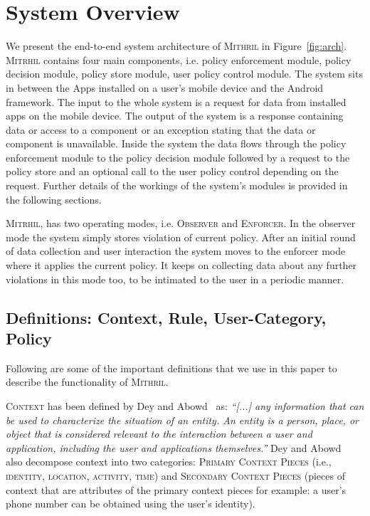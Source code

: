 \section{System Overview}
\label{overview}
We present the end-to-end system architecture of \textsc{Mithril} in Figure~\ref{fig:arch}. \textsc{Mitrhil} contains four main components, i.e. policy enforcement module, policy decision module, policy store module, user policy control module. The system sits in between the Apps installed on a user's mobile device and the Android framework. The input to the whole system is a request for data from installed apps on the mobile device. The output of the system is a response containing data or access to a component or an exception stating that the data or component is unavailable. Inside the system the data flows through the policy enforcement module to the policy decision module followed by a request to the policy store and an optional call to the user policy control depending on the request. Further details of the workings of the system's modules is provided in the following sections.

\textsc{Mitrhil}, has two operating modes, i.e. \textsc{Observer} and \textsc{Enforcer}. In the observer mode the system simply stores violation of current policy. After an initial round of data collection and user interaction the system moves to the enforcer mode where it applies the current policy. It keeps on collecting data about any further violations in this mode too, to be intimated to the user in a periodic manner.


\subsection{Definitions: Context, Rule, User-Category, Policy}
\label{defs}
Following are some of the important definitions that we use in this paper to describe the functionality of \textsc{Mithril}.

\begin{definition}
\textsc{Context} has been defined by Dey and Abowd~\cite{Dey99} as: {\em ``[...] any information that can be used to characterize the situation of an entity. An entity is a person, place, or object that is considered relevant to the interaction between a user and application, including the user and applications themselves.''} Dey and Abowd~\cite{Dey99} also decompose context into two categories: \textsc{Primary Context Pieces} (i.e., \textsc{identity, location, activity, time}) and \textsc{Secondary Context Pieces} (pieces of context that are attributes of the primary context pieces for example: a user's phone number can be obtained using the user's identity).
\end{definition}

